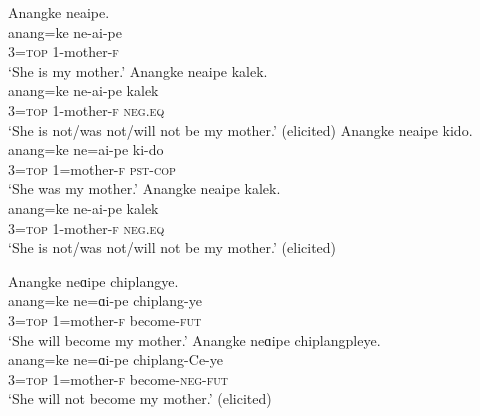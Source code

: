 \documentclass[output=paper,colorlinks,citecolor=brown]{langscibook}
\begin{document}
\ea\label{ex:amr:17}
    \ea\label{ex:amr:17a}Anangke neaipe.  \\ 
        \gll anang=ke ne-ai-pe \\
              3=\textsc{top} 1-mother-\textsc{f} \\
        \glt ‘She is my mother.’ 
    \ex\label{ex:amr:17b}Anangke neaipe kalek. \\
        \gll anang=ke ne-ai-pe kalek\\
              3=\textsc{top} 1-mother-\textsc{f} \textsc{neg.eq}\\
        \glt ‘She is not/was not/will not be my mother.’ (elicited)
    \z 
\z 
\ea\label{ex:amr:17+}
    \ea\label{ex:amr:17c}Anangke neaipe kido.  \\ 
        \gll anang=ke ne=ai-pe ki-do \\
              3=\textsc{top} 1=mother-\textsc{f} \textsc{pst}{}-\textsc{cop} \\
        \glt ‘She was my mother.’ 
    \ex\label{ex:amr:17d}Anangke neaipe kalek.  \\
        \gll  anang=ke ne-ai-pe kalek \\
              3=\textsc{top} 1-mother-\textsc{f} \textsc{neg.eq} \\
        \glt ‘She is not/was not/will not be my mother.’ (elicited)
    \z
\z 

{\ea\label{ex:amr:17++}
    \ea\label{ex:amr:17e} Anangke neɑipe chiplangye.  \\ 
        \gll anang=ke ne=ɑi-pe chiplang-ye \\
              3=\textsc{top} 1=mother-\textsc{f} become-\textsc{fut} \\
        \glt ‘She will become my mother.’ 
    \ex\label{ex:amr:17f}Anangke neɑipe chiplangpleye.  \\
        \gll anang=ke ne=ɑi-pe chiplang-Ce-ye\\
             3=\textsc{top} 1=mother-\textsc{f} become-\textsc{neg}{}-\textsc{fut} \\
        \glt ‘She will not become my mother.’ (elicited)
    \z
\z }
\end{document}
